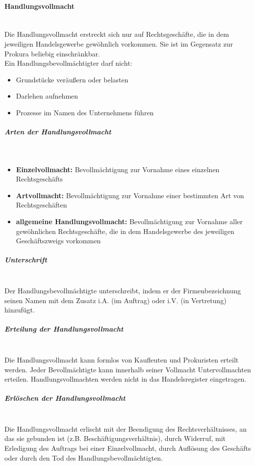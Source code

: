 	\paragraph{Handlungsvollmacht}~\\
	Die Handlungsvollmacht erstreckt sich nur auf Rechtsgeschäfte, die in dem jeweiligen Handelsgewerbe gewöhnlich vorkommen. Sie ist im Gegensatz zur Prokura beliebig einschränkbar.\\
	Ein Handlungsbevollmächtigter darf nicht:\\
	\begin{itemize}
		\item Grundstücke veräußern oder belasten
		\item Darlehen aufnehmen
		\item Prozesse im Namen des Unternehmens führen
	\end{itemize}
	
	\subparagraph{Arten der Handlungsvollmacht}~\\
	\begin{itemize}
		\item {\bf Einzelvollmacht:} Bevollmächtigung zur Vornahme eines einzelnen Rechtsgeschäfts
		\item {\bf Artvollmacht:} Bevollmächtigung zur Vornahme einer bestimmten Art von Rechtsgeschäften
		\item {\bf allgemeine Handlungsvollmacht:} Bevollmächtigung zur Vornahme aller gewöhnlichen Rechtsgeschäfte, die in dem Handelsgewerbe des jeweiligen Geschäftszweigs vorkommen
	\end{itemize}
	
	\subparagraph{Unterschrift}~\\
	Der Handlungsbevollmächtigte unterschreibt, indem er der Firmenbezeichnung seinen Namen mit dem Zusatz i.A. (im Auftrag) oder i.V. (in Vertretung) hinzufügt.\\
	
	\subparagraph{Erteilung der Handlungsvollmacht}~\\
	Die Handlungsvollmacht kann formlos von Kaufleuten und Prokuristen erteilt werden. Jeder Bevollmächtigte kann innerhalb seiner Vollmacht Untervollmachten erteilen. Handlungsvollmachten werden nicht in das Handelsregister eingetragen.\\
	
	\subparagraph{Erlöschen der Handlungsvollmacht}~\\
	Die Handlungsvollmacht erlischt mit der Beendigung des Rechtsverhältnisses, an das sie gebunden ist (z.B. Beschäftigungsverhältnis), durch Widerruf, mit Erledigung des Auftrags bei einer Einzelvollmacht, durch Auflösung des Geschäfts oder durch den Tod des Handlungsbevollmächtigten.\\
	
